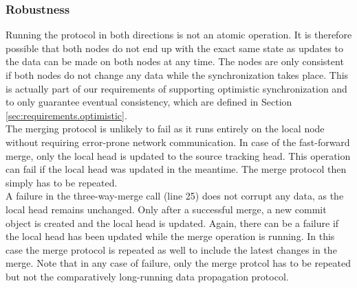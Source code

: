 \subsubsection*{Robustness}
Running the protocol in both directions is not an atomic operation.
It is therefore possible that both nodes do not end up with the exact same state as updates to the data can be made on both nodes at any time.
The nodes are only consistent if both nodes do not change any data while the synchronization takes place.
This is actually part of our requirements of supporting optimistic synchronization and to only guarantee eventual consistency, which are defined in Section \ref{sec:requirements.optimistic}.\\
The merging protocol is unlikely to fail as it runs entirely on the local node without requiring error-prone network communication.
In case of the fast-forward merge, only the local head is updated to the source tracking head.
This operation can fail if the local head was updated in the meantime.
The merge protocol then simply has to be repeated.\\
A failure in the three-way-merge call (line 25) does not corrupt any data, as the local head remains unchanged.
Only after a successful merge, a new commit object is created and the local head is updated.
Again, there can be a failure if the local head has been updated while the merge operation is running.
In this case the merge protocol is repeated as well to include the latest changes in the merge.
Note that in any case of failure, only the merge protcol has to be repeated but not the comparatively long-running data propagation protocol.
